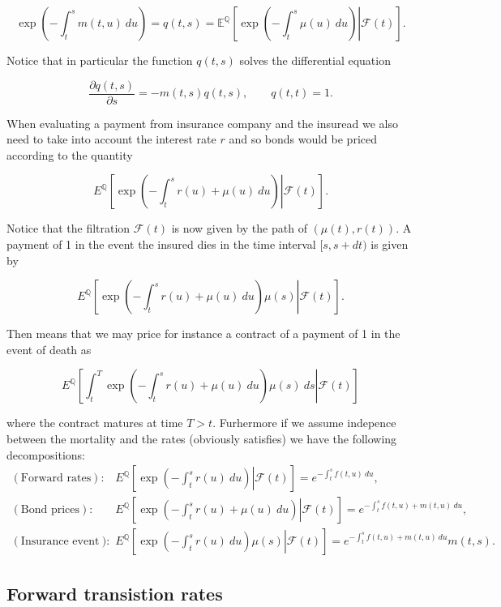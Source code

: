 \documentclass[a4paper,10pt,openany]{book}
\begin{document}
\[
\exp\left(-\int_t^s m(t,u)\ du\right)=q(t,s)=\mathbb E^{\mathbb Q}\left[\left. \exp\left(-\int_t^s\mu(u)\ du\right)\right\vert \mathcal F(t)\right].
\]

Notice that in particular the function \(q(t,s)\) solves the differential equation

\[
\frac{\partial q(t,s)}{\partial s}=-m(t,s)q(t,s),\qquad q(t,t)=1.
\]

When evaluating a payment from insurance company and the insuread we also need to take into account the interest rate \(r\) and so bonds would be priced according to the quantity

\[
E^{\mathbb Q}\left[\left. \exp\left(-\int_t^sr(u)+\mu(u)\ du\right)\right\vert \mathcal F(t)\right].
\]

Notice that the filtration \(\mathcal F(t)\) is now given by the path of \((\mu(t),r(t))\). A payment of 1 in the event the insured dies in the time interval \([s,s+dt)\) is given by

\[
E^{\mathbb Q}\left[\left. \exp\left(-\int_t^sr(u)+\mu(u)\ du\right)\mu(s)\right\vert \mathcal F(t)\right].
\]

Then means that we may price for instance a contract of a payment of 1 in the event of death as

\[
E^{\mathbb Q}\left[\left. \int_t^T\exp\left(-\int_t^sr(u)+\mu(u)\ du\right)\mu(s)\ ds\right\vert \mathcal F(t)\right]
\]

where the contract matures at time \(T>t\). Furhermore if we assume indepence between the mortality and the rates (obviously satisfies) we have the following decompositions:
\begin{align*}
(\text{Forward rates}):\qquad& E^{\mathbb Q}\left[\left. \exp\left(-\int_t^sr(u)\ du\right)\right\vert \mathcal F(t)\right]=e^{-\int_t^sf(t,u)\ du},\\
(\text{Bond prices}):\qquad& E^{\mathbb Q}\left[\left. \exp\left(-\int_t^sr(u)+\mu(u)\ du\right)\right\vert \mathcal F(t)\right]=e^{-\int_t^sf(t,u)+m(t,u)\ du},\\
(\text{Insurance event}):\qquad& E^{\mathbb Q}\left[\left. \exp\left(-\int_t^sr(u)\ du\right)\mu(s)\right\vert \mathcal F(t)\right]=e^{-\int_t^sf(t,u)+m(t,u)\ du}m(t,s).
\end{align*}

\hypertarget{forward-transistion-rates}{%
\subsection{Forward transistion rates}\label{forward-transistion-rates}}
\end{document}
